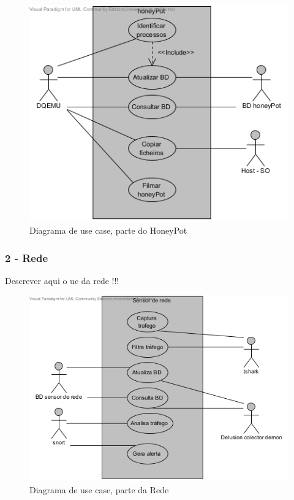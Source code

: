 \begin{figure}[!htb]
	\centering
	\includegraphics[scale=0.80]{images/ucs/HoneyPot}
	\caption {Diagrama de use case, parte do HoneyPot}
\end{figure}
\pagebreak




\subsubsection{\textbf{2 - Rede}}

Descrever aqui o uc da rede !!!

\begin{figure}[!htb]
	\centering
	\includegraphics[scale=0.80]{images/ucs/Rede}
	\caption {Diagrama de use case, parte da Rede}
\end{figure}
\pagebreak




